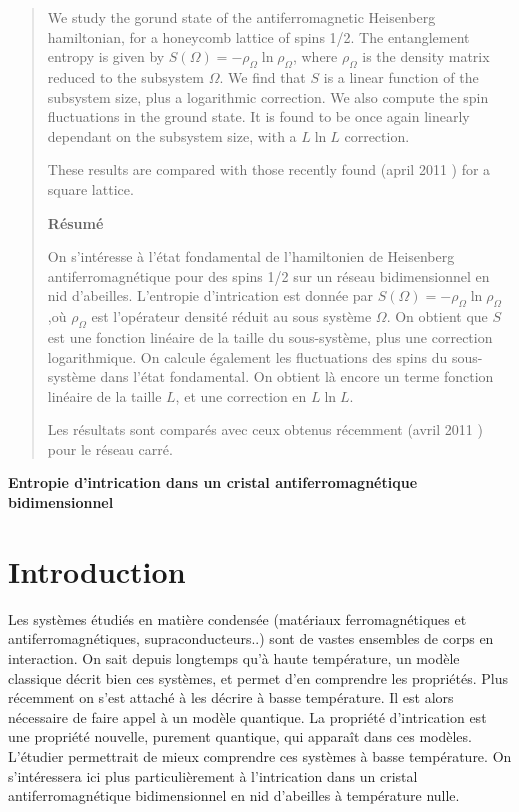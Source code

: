 \documentclass[a4paper, french]{report}
\newcommand{\om}{\ensuremath{\Omega}\xspace}
\newcommand{\1}{\ensuremath{\ket{\om_1\bom_1}}\xspace}
\newcommand{\2}{\ensuremath{\ket{\om_2\bom_2}}\xspace}
\begin{document}
\begin{abstract}
We study the gorund state of the antiferromagnetic Heisenberg hamiltonian, for a honeycomb lattice of spins 1/2. The entanglement entropy is given by $S(\Omega)=-\rho_{\Omega}\ln\rho_{\Omega}$, where $\rho_{\Omega}$ is the density matrix reduced to the subsystem \om. We find that $S$ is a linear function of the subsystem size, plus a logarithmic correction. We also compute the spin fluctuations in the ground state. It is found to be once again linearly dependant on the subsystem size, with a $L\ln L$ correction.

These results are compared with those recently found (april 2011 \cite{laflo}) for a square lattice.

\begin{center}
\textbf{Résumé}
\end{center}
On s'intéresse à l'état fondamental de l'hamiltonien de Heisenberg antiferromagnétique pour des spins 1/2 sur un réseau bidimensionnel en nid d'abeilles. L'entropie d'intrication est donnée par $S(\Omega)=-\rho_{\Omega}\ln\rho_{\Omega}$,où $\rho_{\Omega}$ est l'opérateur densité réduit au sous système \om. On obtient que $S$ est une fonction linéaire de la taille du sous-système, plus une correction logarithmique. On calcule également les fluctuations des spins du sous-système dans l'état fondamental. On obtient là encore un terme fonction linéaire de la taille $L$, et une correction en $L \ln L$.

Les résultats sont comparés avec ceux obtenus récemment (avril 2011 \cite{laflo}) pour le réseau carré.
\end{abstract}

\begin{center}
\Huge \textbf{Entropie d'intrication dans un cristal antiferromagnétique bidimensionnel}
\end{center}


\section*{\Huge{Introduction}}
Les systèmes étudiés en matière condensée (matériaux ferromagnétiques et antiferromagnétiques, supraconducteurs..) sont de vastes ensembles de corps en interaction. On sait depuis longtemps qu'à haute température, un modèle classique décrit bien ces systèmes, et permet d'en comprendre les propriétés. Plus récemment on s'est attaché à les décrire à basse température. Il est alors nécessaire de faire appel à un modèle quantique. La propriété d'intrication est une propriété nouvelle, purement quantique, qui apparaît dans ces modèles\cite{eisert, peschel}. L'étudier permettrait de mieux comprendre ces systèmes à basse température. On s'intéressera ici plus particulièrement à l'intrication dans un cristal antiferromagnétique bidimensionnel en nid d'abeilles à température nulle.
\end{document}
